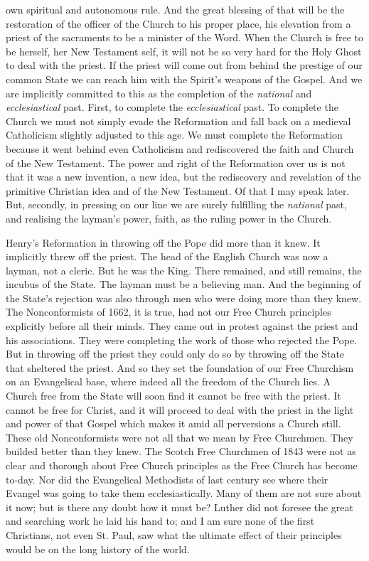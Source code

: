 \documentclass[12pt,a5paper,twoside]{book}
\begin{document}
own spiritual and autonomous rule. And the great 
blessing of that will be the restoration of the officer 
of the Church to his proper place, his elevation from 
a priest of the sacraments to be a minister of the 
Word. When the Church is free to be herself, her 
New Testament self, it will not be so very hard for 
the Holy Ghost to deal with the priest. If the priest 
will come out from behind the prestige of our 
common State we can reach him with the Spirit's 
weapons of the Gospel. And we are implicitly committed 
to this as the completion of the \textit{national} and 
\textit{ecclesiastical} past. First, to complete the \textit{ecclesiastical} 
past. To complete the Church we must not simply 
evade the Reformation and fall back on a medieval 
Catholicism slightly adjusted to this age. We must 
complete the Reformation because it went behind even 
Catholicism and rediscovered the faith and Church 
of the New Testament. The power and right of 
the Reformation over us is not that it was a new 
invention, a new idea, but the rediscovery and revelation 
of the primitive Christian idea and of the New 
Testament. Of that I may speak later. But, secondly, 
in pressing on our line we are surely fulfilling the 
\textit{national} past, and realising the layman's power, faith, 
as the ruling power in the Church. 

Henry's Reformation in throwing off the Pope did 
more than it knew. It implicitly threw off the 
priest. The head of the English Church was now 
a layman, not a cleric. But he was the King. 
There remained, and still remains, the incubus of 
the State. The layman must be a believing man. 
And the beginning of the State's rejection was also 
through men who were doing more than they knew. 
The Nonconformists of 1662, it is true, had not our 
Free Church principles explicitly before all their minds. 
They came out in protest against the priest and his 
associations. They were completing the work of 
those who rejected the Pope. But in throwing off 
the priest they could only do so by throwing off the 
State that sheltered the priest. And so they set the 
foundation of our Free Churchism on an Evangelical 
base, where indeed all the freedom of the Church 
lies. A Church free from the State will soon find it 
cannot be free with the priest. It cannot be free for 
Christ, and it will proceed to deal with the priest in 
the light and power of that Gospel which makes it 
amid all perversions a Church still. These old Nonconformists 
were not all that we mean by Free 
Churchmen. They builded better than they knew. 
The Scotch Free Churchmen of 1843 were not as 
clear and thorough about Free Church principles as 
the Free Church has become to-day. Nor did the 
Evangelical Methodists of last century see where their 
Evangel was going to take them ecclesiastically. 
Many of them are not sure about it now; but is 
there any doubt how it must be? Luther did not 
foresee the great and searching work he laid his hand 
to; and I am sure none of the first Christians, not 
even St. Paul, saw what the ultimate effect of their 
principles would be on the long history of the world. 
\end{document}

